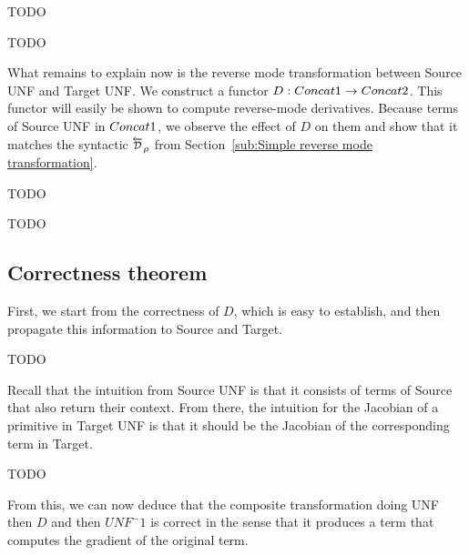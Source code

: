 \begin{definition}
    TODO
\end{definition}

\begin{proposition}
    TODO
\end{proposition}

What remains to explain now is the reverse mode transformation between Source UNF and Target UNF.
We construct a functor $D:Concat1\to Concat2$. 
This functor will easily be shown to compute reverse-mode derivatives.
Because terms of Source UNF in $Concat1$, we observe the effect of $D$ on them
and show that it matches the syntactic $\Dsynrevsymbol_{\rho}$ 
from Section~\ref{sub:Simple reverse mode transformation}.

\begin{definition}
    TODO
\end{definition}

\begin{proposition}
    TODO
\end{proposition}


\subsection{Correctness theorem} %
\label{sub:Correctness theorem}

First, we start from the correctness of $D$, which is easy to establish, 
and then propagate this information to Source and Target.

\begin{proposition}[Correctness $D$]
    TODO
\end{proposition}

Recall that the intuition from Source UNF is that it consists of terms of Source that also return their context.
From there, the intuition for the Jacobian of a primitive in Target UNF is that it should be the Jacobian of
the corresponding term in Target. 


\begin{proposition}
    TODO
\end{proposition}

From this, we can now deduce that the composite transformation doing UNF then $D$ and then $UNF^-1$ is correct
in the sense that it produces a term that computes the gradient of the original term.

